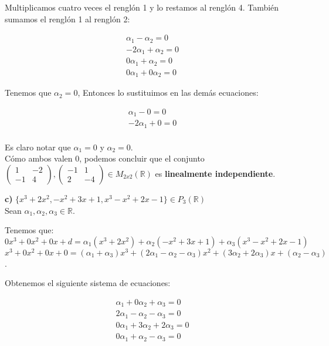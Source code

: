 \documentclass[letterpaper]{article}
\renewcommand{\*}{\cdot}
\theoremstyle{definition}
\begin{document}
Multiplicamos cuatro veces el renglón 1 y lo restamos al renglón 4. También sumamos el renglón 1 al renglón 2:
\begin{center}
	\begin{align*}
	\alpha_{1}-\alpha_{2} = 0\\
	-2\alpha_{1} + \alpha_{2} = 0\\
	0\alpha_{1}+\alpha_{2}= 0\\
	0\alpha_{1}+0\alpha_{2}= 0
	\end{align*}
\end{center}
Tenemos que $\alpha_{2}= 0$, Entonces lo sustituimos en las demás ecuaciones:
\begin{center}
	\begin{align*}
	\alpha_{1}-0 = 0\\
	-2\alpha_{1} + 0 = 0\\
	\end{align*}
\end{center}
Es claro notar que $\alpha_{1}=0$ y $\alpha_{2}=0$.\\ Cómo ambos valen 0, podemos concluir que el conjunto $\begin{pmatrix} 1 & -2 \\ -1 & 4 \end{pmatrix} ,\begin{pmatrix} -1 & 1 \\ 2 & -4 \end{pmatrix}\in M_{2x2}(\mathbb{R})$ es \textbf{linealmente independiente}.

\textbf{c)} $\lbrace x^{3} + 2x^{2}, -x^{2} + 3x + 1, x^{3} - x^{2} + 2x -1 \rbrace \in P_{3}(\mathbb{R})$ \\

Sean $\alpha_{1}, \alpha_{2}, \alpha_{3}\in \mathbb{R}$.

Tenemos que: $0x^{3}+0x^{2}+0x+d = \alpha_{1}(x^{3}+2x^{2})+ \alpha_{2}(-x^{2}+3x+1)+ \alpha_{3}(x^{3}-x^{2}+2x-1)$ \\  
        
 $x^{3}+0x^{2}+0x+0=(\alpha_{1}+\alpha_{3})x^{3}+(2\alpha_{1}-\alpha_{2}-\alpha_{3})x^{2}+(3\alpha_{2}+2\alpha_{3})x+(\alpha_{2}-\alpha_{3})$.
 
 Obtenemos el siguiente sistema de ecuaciones:
 \begin{center}
 	\begin{align*}
 	\alpha_{1}+0\alpha_{2}+\alpha_{3}=0\\
 	2\alpha_{1}-\alpha_{2}-\alpha_{3}=0\\
 	0\alpha_{1}+3\alpha_{2}+2\alpha_{3}=0\\
 	0\alpha_{1}+\alpha_{2}-\alpha_{3}=0
 	\end{align*}
 \end{center}
\end{document}
